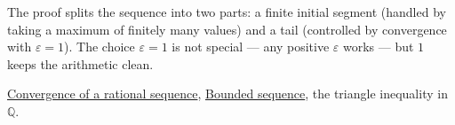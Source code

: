 \begin{remark*}
The proof splits the sequence into two parts: a finite initial segment
(handled by taking a maximum of finitely many values) and a tail
(controlled by convergence with $\varepsilon = 1$).  The choice
$\varepsilon = 1$ is not special — any positive $\varepsilon$ works — but
$1$ keeps the arithmetic clean.
\end{remark*}

\begin{dependencies}
\hyperref[def:convergent-rational-sequence]{Convergence of a rational sequence},
\hyperref[def:bounded-sequence-q]{Bounded sequence},
the triangle inequality in $\mathbb{Q}$.
\end{dependencies}
